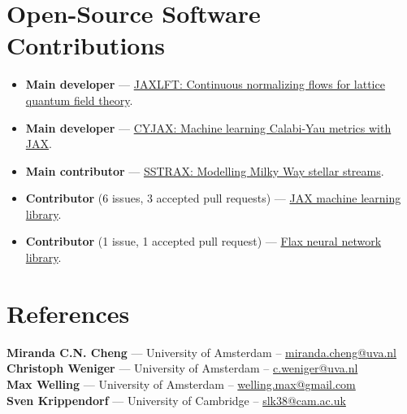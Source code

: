 \documentclass[11pt, letterpaper]{article}
\begin{document}
\section*{Open-Source Software Contributions}
\begin{itemize}[left=0pt, itemsep=3pt]
    \item \textbf{Main developer} — \href{https://github.com/mathisgerdes/continuous-flow-lft}{JAXLFT: Continuous normalizing flows for lattice quantum field theory}.
    \item \textbf{Main developer} — \href{https://github.com/ml4physics/cyjax}{CYJAX: Machine learning Calabi-Yau metrics with JAX}.
    \item \textbf{Main contributor} — \href{https://github.com/undark-lab/sstrax}{SSTRAX: Modelling Milky Way stellar streams}.
    \item \textbf{Contributor} (6 issues, 3 accepted pull requests) — \href{https://github.com/google/jax/issues?q=author:mathisgerdes}{JAX machine learning library}.
    \item \textbf{Contributor} (1 issue, 1 accepted pull request) — \href{https://github.com/google/flax/issues?q=author:mathisgerdes}{Flax neural network library}.
\end{itemize}


\section*{References}
\noindent
\textbf{Miranda C.N. Cheng} — University of Amsterdam -- \href{mailto:c.n.cheng@uva.nl}{miranda.cheng@uva.nl} \\
\textbf{Christoph Weniger} — University of Amsterdam  -- \href{mailto:c.weniger@uva.nl}{c.weniger@uva.nl} \\
\textbf{Max Welling} — University of Amsterdam -- \href{mailto:welling.max@gmail.com}{welling.max@gmail.com} \\
\textbf{Sven Krippendorf} — University of Cambridge -- \href{mailto:slk38@cam.ac.uk}{slk38@cam.ac.uk}
\end{document}
